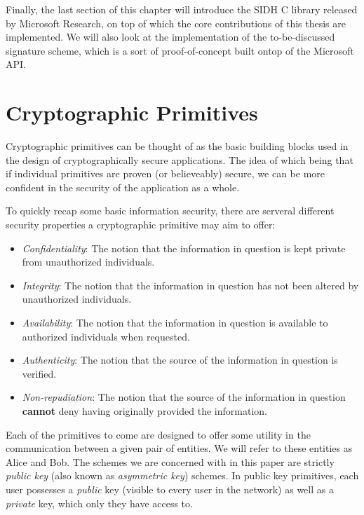 Finally, the last section of this chapter will introduce the SIDH C library released by Microsoft Research, on top of which the core contributions of this thesis are implemented. We will also look at the implementation of the to-be-discussed signature scheme, which is a sort of proof-of-concept built ontop of the Microsoft API.\\


\section{Cryptographic Primitives}

Cryptographic primitives can be thought of as the basic building blocks used in the design of cryptographically secure applications. The idea of which being that if individual primitives are proven (or believeably) secure, we can be more confident in the security of the application as a whole.

To quickly recap some basic information security, there are serveral different security properties a cryptographic primitive may aim to offer:
\begin{itemize}
\item \emph{Confidentiality}:
The notion that the information in question is kept private from unauthorized individuals.
\item \emph{Integrity}:
The notion that the information in question has not been altered by unauthorized individuals.
\item \emph{Availability}:
The notion that the information in question is available to authorized individuals when requested.
\item \emph{Authenticity}:
The notion that the source of the information in question is verified.
\item \emph{Non-repudiation}:
The notion that the source of the information in question \textbf{cannot} deny having originally provided the information.
\end{itemize}

Each of the primitives to come are designed to offer some utility in the communication between a given pair of entities. We will refer to these entities as Alice and Bob. The schemes we are concerned with in this paper are strictly \emph{public key} (also known as \emph{asymmetric key}) schemes. In public key primitives, each user possesses a \emph{public} key (visible to every user in the network) as well as a \emph{private} key, which only they have access to. 

